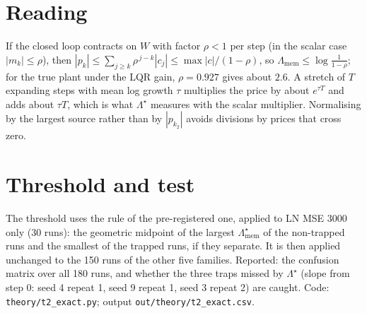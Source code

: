 \documentclass[11pt]{article}
\begin{document}
\section*{Reading}
If the closed loop contracts on $W$ with factor $\rho<1$ per step (in the scalar case $|m_k|\le\rho$), then
$|p_k|\le\sum_{j\ge k}\rho^{\,j-k}|c_j|\le\max|c|/(1-\rho)$, so $\Lambda_{\mathrm{mem}}\le\log\frac1{1-\rho}$; for the true plant
under the LQR gain, $\rho=0.927$ gives about $2.6$. A stretch of $T$ expanding steps with mean log growth $\tau$ multiplies the
price by about $e^{\tau T}$ and adds about $\tau T$, which is what $\Lambda^\star$ measures with the scalar multiplier.
Normalising by the largest source rather than by $|p_{k_2}|$ avoids divisions by prices that cross zero.

\section*{Threshold and test}
The threshold uses the rule of the pre-registered one, applied to LN MSE 3000 only (30 runs): the geometric midpoint of the
largest $\Lambda^\star_{\mathrm{mem}}$ of the non-trapped runs and the smallest of the trapped runs, if they separate. It is then
applied unchanged to the 150 runs of the other five families. Reported: the confusion matrix over all 180 runs, and whether the
three traps missed by $\Lambda^\star$ (slope from step 0: seed 4 repeat 1, seed 9 repeat 1, seed 3 repeat 2) are caught.
Code: \texttt{theory/t2\_exact.py}; output \texttt{out/theory/t2\_exact.csv}.
\end{document}
